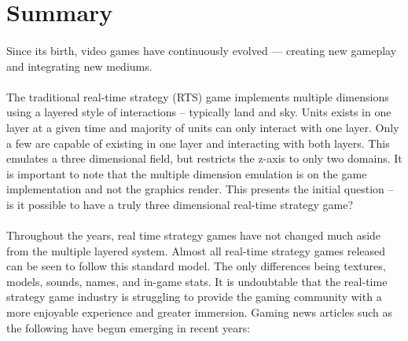 

\usepackage{float}
\usepackage[hidelinks]{hyperref}

\newcommand{\namesigdate}[2][5cm]{%
	\begin{tabular}{@{}p{#1}@{}}
		#2 \\[\normalbaselineskip] \hrule \\[0pt]
		{\small \textit{Name (Printed)}} \\
		[\normalbaselineskip] \hrule \\[0pt]
		{\small \textit{Signature}}\\
		[\normalbaselineskip] \hrule \\[0pt]
		{\small \textit{Date}}
	\end{tabular}
}



\maketitle

\section{Summary}

\paragraph{} Since its birth, video games have continuously evolved --- creating new gameplay and integrating new mediums.

\paragraph{} The traditional real-time strategy (RTS) game implements multiple dimensions using a layered style of interactions -- typically land and sky. Units exists in one layer at a given time and majority of units can only interact with one layer.  Only a few are capable of existing in one layer and interacting with both layers. This emulates a three dimensional field, but restricts the z-axis to only two domains. It is important to note that the multiple dimension emulation is on the game implementation and not the graphics render. This presents the initial question -- is it possible to have a truly three dimensional real-time strategy game?

\paragraph{} Throughout the years, real time strategy games have not changed much aside from the multiple layered system. Almost all real-time strategy games released can be seen to follow this standard model. The only differences being textures, models, sounds, names, and in-game stats. It is undoubtable that the real-time strategy game industry is struggling to provide the gaming community with a more enjoyable experience and greater immersion. Gaming news articles such as the following have begun emerging in recent years:

